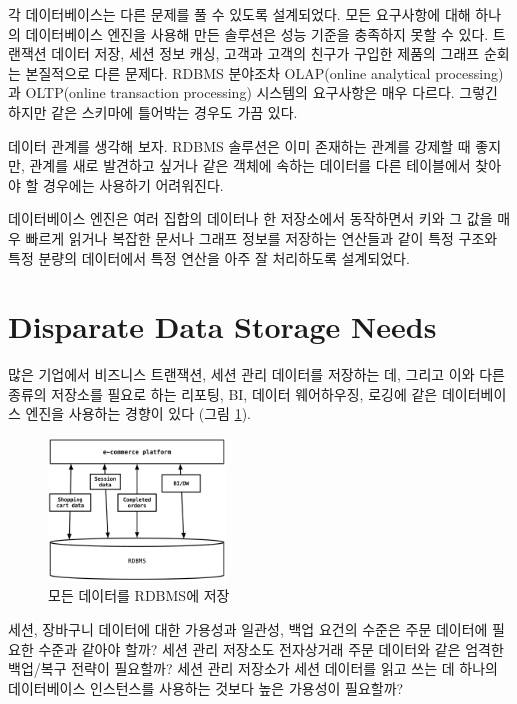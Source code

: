 \documentclass[twocolumn]{article}
\begin{document}

 각 데이터베이스는 다른 문제를 풀 수 있도록 설계되었다. 모든 요구사항에 대해 하나의 데이터베이스 엔진을 사용해 만든 솔루션은 성능 기준을 충족하지 못할 수 있다. 트랜잭션 데이터 저장, 세션 정보 캐싱, 고객과 고객의 친구가 구입한 제품의 그래프 순회는 본질적으로 다른 문제다\cite{FOWLER:2013}. RDBMS 분야조차 OLAP(online analytical processing)과 OLTP(online transaction processing) 시스템의 요구사항은 매우 다르다. 그렇긴 하지만 같은 스키마에 틀어박는 경우도 가끔 있다. 

데이터 관계를 생각해 보자. RDBMS 솔루션은 이미 존재하는 관계를 강제할 때 좋지만, 관계를 새로 발견하고 싶거나 같은 객체에 속하는 데이터를 다른 테이블에서 찾아야 할 경우에는 사용하기 어려워진다.

데이터베이스 엔진은 여러 집합의 데이터나 한 저장소에서 동작하면서 키와 그 값을 매우 빠르게 읽거나 복잡한 문서나 그래프 정보를 저장하는 연산들과 같이 특정 구조와 특정 분량의 데이터에서 특정 연산을 아주 잘 처리하도록 설계되었다.

\section{Disparate Data Storage Needs}
많은 기업에서 비즈니스 트랜잭션, 세션 관리 데이터를 저장하는 데, 그리고 이와 다른 종류의 저장소를 필요로 하는 리포팅, BI, 데이터 웨어하우징, 로깅에 같은 데이터베이스 엔진을 사용하는 경향이 있다 (그림 \ref{fig01}).

\begin{figure}[!t]
        \centering
        \includegraphics[width=0.42\textwidth]{rdbms}
        \caption{모든 데이터를 RDBMS에 저장}
        \label{fig01}
\end{figure}

세션, 장바구니 데이터에 대한 가용성과 일관성, 백업 요건의 수준은 주문 데이터에 필요한 수준과 같아야 할까? 세션 관리 저장소도 전자상거래 주문 데이터와 같은 엄격한 백업/복구 전략이 필요할까? 세션 관리 저장소가 세션 데이터를 읽고 쓰는 데 하나의 데이터베이스 인스턴스를 사용하는 것보다 높은 가용성이 필요할까?
\end{document}
